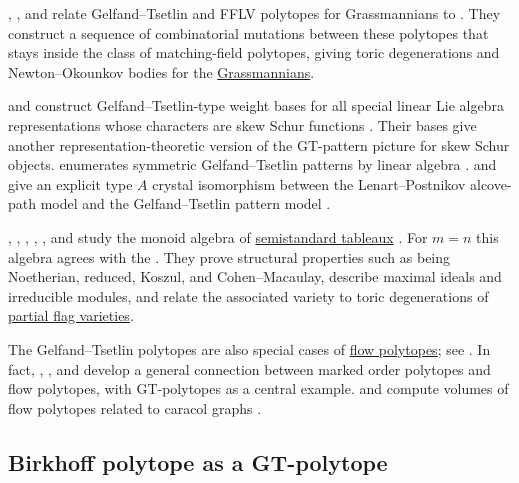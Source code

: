 , , and
 relate Gelfand--Tsetlin and FFLV polytopes for
Grassmannians to
\label{matchingFieldPolytope}
\cite{ClarkeHigashitaniMohammadi2024}.
They construct a sequence of combinatorial mutations between these polytopes
that stays inside the class of matching-field polytopes, giving toric
degenerations and Newton--Okounkov bodies for the
\hyperref[grassmannianVarieties]{Grassmannians}.

 and  construct
Gelfand--Tsetlin-type weight bases for all special linear Lie algebra
representations whose characters are skew Schur functions
\cite{DonnellyDunkum2022}.  Their bases give another representation-theoretic
version of the GT-pattern picture for skew Schur objects.
 enumerates symmetric Gelfand--Tsetlin patterns by linear
algebra \cite{Fulmek2019x}.
 and  give an explicit type $A$
crystal isomorphism between the Lenart--Postnikov alcove-path model and the
Gelfand--Tsetlin pattern model \cite{WatanabeYamamura2021}.

, , ,
, , and  study
the monoid algebra of \hyperref[prelimTableaux]{semistandard tableaux}
\cite{DaughertyGonzalezMunizOcalPanTorres2025x}.
For $m=n$ this algebra agrees with the
\label{gtSemigroupRing}.  They
prove structural properties such as being Noetherian, reduced, Koszul, and
Cohen--Macaulay, describe maximal ideals and irreducible modules, and relate
the associated variety to toric degenerations of
\hyperref[flagVarieties]{partial flag varieties}.

The Gelfand--Tsetlin polytopes are also special cases of
\hyperref[flowPolytopeDefinition]{flow polytopes}; see
\cite{LiuMeszarosDizier2019flow}.  In fact,
, , and
 develop a general connection between marked order
polytopes and flow polytopes, with GT-polytopes as a central example.
 and  compute volumes of
flow polytopes related to caracol graphs \cite{JangKim2020}.


\subsection[birkhoffPolytopeAsGelfandTsetlin]{Birkhoff polytope as a GT-polytope}

